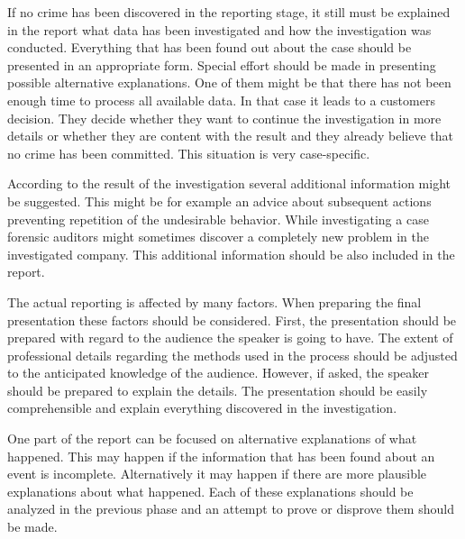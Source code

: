 If no crime has been discovered in the reporting stage, it still must be explained in the report what data has been investigated and how the investigation was conducted. Everything that has been found out about the case should be presented in an appropriate form. Special effort should be made in presenting possible alternative explanations. One of them might be that there has not been enough time to process all available data. In that case it leads to a customers decision. They decide whether they want to continue the investigation in more details or whether they are content with the result and they already believe that no crime has been committed. This situation is very case-specific. 

According to the result of the investigation several additional information might be suggested. This might be for example an advice about subsequent actions preventing repetition of the undesirable behavior. While investigating a case forensic auditors might sometimes discover a completely new problem in the investigated company. This additional information should be also included in the report. 

The actual reporting is affected by many factors. When preparing the final presentation these factors should be considered. First, the presentation should be prepared with regard to the audience the speaker is going to have. The extent of professional details regarding the methods used in the process should be adjusted to the anticipated knowledge of the audience. However, if asked, the speaker should be prepared to explain the details. The presentation should be easily comprehensible and explain everything discovered in the investigation. 

One part of the report can be focused on alternative explanations of what happened. This may happen if the information that has been found about an event is incomplete. Alternatively it may happen if there are more plausible explanations about what happened. Each of these explanations should be analyzed in the previous phase and an attempt to prove or disprove them should be made.


